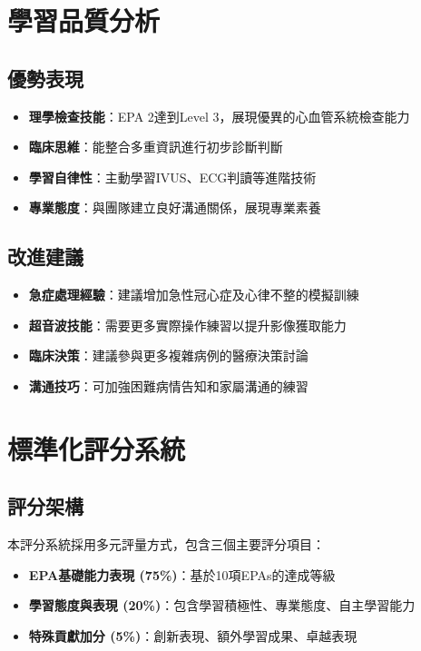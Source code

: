\documentclass[12pt,a4paper]{article}
\begin{document}
\section{學習品質分析}

\subsection{優勢表現}

\begin{itemize}
\item \textbf{理學檢查技能}：EPA 2達到Level 3，展現優異的心血管系統檢查能力
\item \textbf{臨床思維}：能整合多重資訊進行初步診斷判斷
\item \textbf{學習自律性}：主動學習IVUS、ECG判讀等進階技術
\item \textbf{專業態度}：與團隊建立良好溝通關係，展現專業素養
\end{itemize}

\subsection{改進建議}

\begin{itemize}
\item \textbf{急症處理經驗}：建議增加急性冠心症及心律不整的模擬訓練
\item \textbf{超音波技能}：需要更多實際操作練習以提升影像獲取能力  
\item \textbf{臨床決策}：建議參與更多複雜病例的醫療決策討論
\item \textbf{溝通技巧}：可加強困難病情告知和家屬溝通的練習
\end{itemize}

\section{標準化評分系統}

\subsection{評分架構}

本評分系統採用多元評量方式，包含三個主要評分項目：
\begin{itemize}
\item \textbf{EPA基礎能力表現 (75\%)}：基於10項EPAs的達成等級
\item \textbf{學習態度與表現 (20\%)}：包含學習積極性、專業態度、自主學習能力
\item \textbf{特殊貢獻加分 (5\%)}：創新表現、額外學習成果、卓越表現
\end{itemize}
\end{document}
